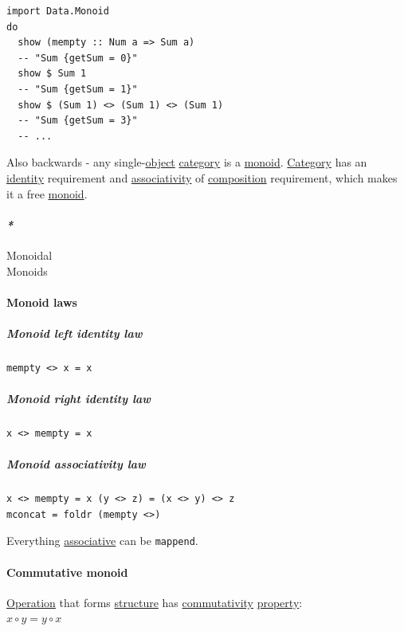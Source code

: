 \documentclass[a4paper,14pt,oneside]{book}
\begin{document}
{\begin{verbatim}
import Data.Monoid
do
  show (mempty :: Num a => Sum a)
  -- "Sum {getSum = 0}"
  show $ Sum 1
  -- "Sum {getSum = 1}"
  show $ (Sum 1) <> (Sum 1) <> (Sum 1)
  -- "Sum {getSum = 3}"
  -- ...
\end{verbatim}

Also backwards - any single-\hyperref[orgcc1bbec]{object} \hyperref[orgf2b19ad]{category} is a \hyperref[orgcf84af2]{monoid}. \hyperref[orgf2b19ad]{Category} has an \hyperref[org4f76d7c]{identity} requirement and \hyperref[org3131bc4]{associativity} of \hyperref[orgd27cab7]{composition} requirement, which makes it a free \hyperref[orgcf84af2]{monoid}.\\

\paragraph{\emph{*}}
\label{sec:orgd0f5974}

\label{orgaf25a8c}Monoidal\\
\label{orgb3b2402}Monoids\\

\paragraph{\label{org58c19fb}Monoid laws}
\label{sec:orga6c472b}
\subparagraph{\label{org4cd3a50}Monoid left identity law}
\label{sec:org479c9a9}
\begin{verbatim}
mempty <> x = x
\end{verbatim}

\subparagraph{\label{org56e8b24}Monoid right identity law}
\label{sec:orgb13963e}
\begin{verbatim}
x <> mempty = x
\end{verbatim}

\subparagraph{\label{org27eccbe}Monoid associativity law}
\label{sec:orge896e3a}
\begin{verbatim}
x <> mempty = x (y <> z) = (x <> y) <> z
mconcat = foldr (mempty <>)
\end{verbatim}

Everything \hyperref[org3beb7c5]{associative} can be \texttt{mappend}.\\

\paragraph{\label{org655376b}Commutative monoid}
\label{sec:org85d4639}
\hyperref[org4cee8d5]{Operation} that forms \hyperref[org080800e]{structure} has \hyperref[org72d6f03]{commutativity} \hyperref[org2731790]{property}:\\
\(x \circ y = y \circ x\)\\

}
\end{document}
